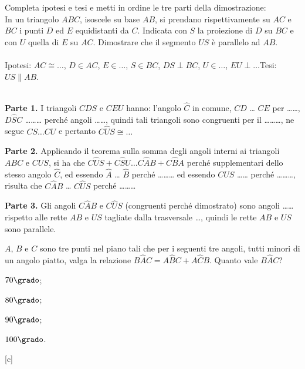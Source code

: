 \begin{esercizio}
\label{ese:3.20}
Completa ipotesi e tesi e metti in ordine le tre parti della 
dimostrazione:\\
In un triangolo \(ABC\), isoscele su base \(AB\), si prendano 
rispettivamente su \(AC\) e \(BC\) i punti \(D\) ed \(E\) equidistanti da 
\(C\). Indicata con \(S\) la proiezione di \(D\) su \(BC\) e con \(U\) quella di 
\(E\) su \(AC\). Dimostrare che il segmento \(US\) è parallelo ad \(AB\).\\
~\\
\noindent Ipotesi: \(AC\cong \ldots\), \(D\in AC\), \(E\in \ldots\), \(S\in 
BC\), \(DS\perp BC\), \(U\in \ldots\), \(EU\perp \ldots\)\hfill Tesi: 
\(US\parallel AB\).\\
~\\
\noindent\begin{minipage}{.75\textwidth}
\textbf{Parte 1.} I triangoli \(CDS\) e \(CEU\)  hanno: l'angolo 
\(\widehat{C}\) in comune, \(CD\) \ldots{} \(CE\) per \ldots\ldots{}, 
\(D\widehat{S}C\) \ldots\ldots\ldots{} perché angoli \ldots\ldots{}, 
quindi tali triangoli sono congruenti per il \ldots\ldots\ldots{}, ne 
segue \(CS \ldots CU\) e pertanto \(C\widehat{U}S\cong \ldots\)\par

\textbf{Parte 2.} Applicando il teorema sulla somma degli angoli 
interni ai triangoli \(ABC\) e \(CUS\), si ha che \(C\widehat{U}S + 
C\widehat{S}U \ldots{} C\widehat{A}B + C\widehat{B}A\) perché 
supplementari dello stesso angolo \(\widehat{C}\), ed essendo 
\(\widehat{A}\) \dots{} \(\widehat{B}\) perché \ldots\ldots\ldots{} ed 
essendo \(C\widehat{U}S\) \ldots\ldots{} perché \ldots\ldots\ldots{}, 
risulta che \(C\widehat{A}B\) \ldots{} \(C\widehat{U}S\) perché 
\ldots\ldots\ldots{}\par

\textbf{Parte 3.} Gli angoli \(C\widehat{A}B\) e \(C\widehat{U}S\) 
(congruenti perché dimostrato) sono angoli \ldots\ldots rispetto alle 
rette \(AB\) e \(US\) tagliate dalla trasversale \ldots, quindi le rette 
\(AB\) e \(US\) sono parallele.
\end{minipage}\hfil
\begin{minipage}{.25\textwidth}
\centering
\end{minipage}
\end{esercizio}

\begin{esercizio}  %
\label{ese:3.21}
\(A\), \(B\) e \(C\) sono tre punti nel piano tali che per i seguenti tre 
angoli, tutti minori di un angolo piatto, valga la relazione 
\(B\widehat{A}C=A\widehat{B}C+A\widehat{C}B\). Quanto vale 
\(B\widehat{A}C\)?
\begin{multicols}{4}
\begin{enumeratea}
\item \(70\grado\);
\item \(80\grado\);
\item \(90\grado\);
\item \(100\grado\).
\end{enumeratea}
\end{multicols}
\hfill[c]
\end{esercizio}

